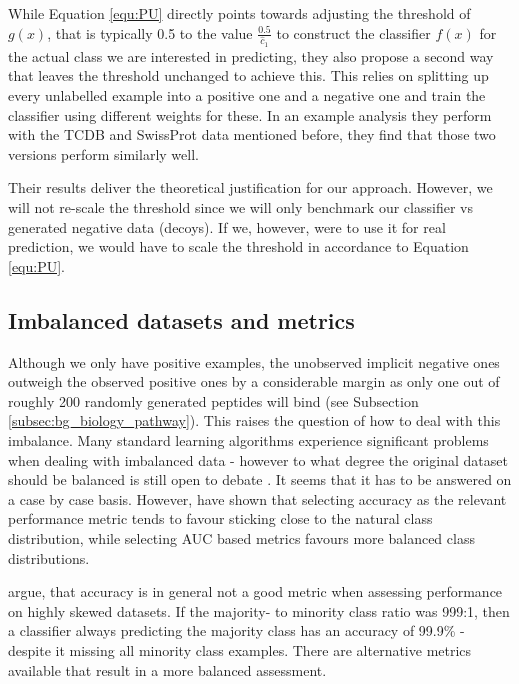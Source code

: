 \documentclass[msc,deptreport,ai]{infthesis} %
\begin{document}
		While Equation \ref{equ:PU} directly points towards adjusting the threshold of $g(x)$, that is typically 0.5 to the value $\frac{0.5}{\hat c_1}$ to construct the classifier $f(x)$ for the actual class we are interested in predicting, they also propose a second way that leaves the threshold unchanged to achieve this. This relies on splitting up every unlabelled example into a positive one and a negative one and train the classifier using different weights for these. In an example analysis they perform with the TCDB and SwissProt data mentioned before, they find that those two versions perform similarly well.
		
		Their results deliver the theoretical justification for our approach. However, we will not re-scale the threshold since we will only benchmark our classifier vs generated negative data (decoys). If we, however, were to use it for real prediction, we would have to scale the threshold in accordance to Equation \ref{equ:PU}.		

	\subsection{Imbalanced datasets and metrics}
	\label{subsec:imbalanced}
		Although we only have positive examples, the unobserved implicit negative ones outweigh the observed positive ones by a considerable margin as only one out of roughly 200 randomly generated peptides will bind (see Subsection \ref{subsec:bg_biology_pathway}). This raises the question of how to deal with this imbalance. Many standard learning algorithms experience significant problems when dealing with imbalanced data - however to what degree the original dataset should be balanced is still open to debate \cite{he_learning_2009}. It seems that it has to be answered on a case by case basis. However, \citeauthor{weiss_learning_2003} \cite{weiss_learning_2003} have shown that selecting accuracy as the relevant performance metric tends to favour sticking close to the natural class distribution, while selecting \gls{AUC} based metrics favours more balanced class distributions.
		
		\citeauthor{he_learning_2009} \cite{he_learning_2009} argue, that accuracy is in general not a good metric when assessing performance on highly skewed datasets. If the majority- to minority class ratio was 999:1, then a classifier always predicting the majority class has an accuracy of 99.9\% - despite it missing all minority class examples. There are alternative metrics available that result in a more balanced assessment.
		
\end{document}
